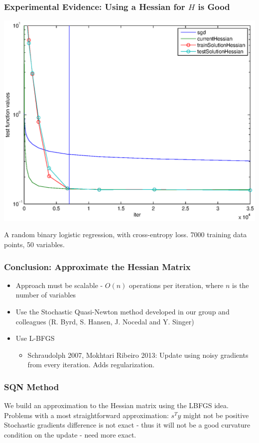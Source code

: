 \documentclass{beamer}
\begin{document}
\begin{frame}
	\frametitle{Experimental Evidence: Using a Hessian for $H$ is Good}
		\begin{center}
				\includegraphics[scale=0.4]{figures/P0.eps}
		\end{center}	
		A random binary logistic regression, with cross-entropy loss. 7000 training data points, 50 variables.
\end{frame}

\begin{frame}
	\frametitle{Conclusion: Approximate the Hessian Matrix}
	\begin{itemize}
		\pause
		\item Approach must be scalable - $O(n)$ operations per iteration, where $n$ is the number of variables
		\pause
		\item Use the Stochastic Quasi-Newton method developed in our group and colleagues (R. Byrd, S. Hansen, J. Nocedal and Y. Singer)
		\pause
		\item Use L-BFGS
		\begin{itemize}
			\item Schraudolph 2007, Mokhtari Ribeiro 2013: Update using noisy gradients from every iteration. Adds regularization.
		\end{itemize}
 	\end{itemize}
\end{frame}

\begin{frame}
	\frametitle{SQN Method}
	We build an approximation to the Hessian matrix using the LBFGS idea. 
	Problems with a most straightforward approximation:
	$s^Ty$ might not be positive
	Stochastic gradients difference is not exact - thus it will not be a good curvature condition on the update - need more exact. 
\end{frame}
\end{document}

